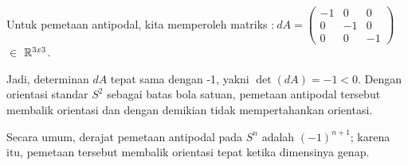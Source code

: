 Untuk pemetaan antipodal, kita memperoleh matriks
:$
\ dA = \begin{pmatrix}
-1 & 0 & 0 \\
0 & -1 & 0 \\
0 & 0 & -1 \end{pmatrix}
$ $ \in $ ${\mathbb R}^{3x3}$.

Jadi, determinan $dA$ tepat sama dengan -1, yakni
 $ \det(dA) = -1 <0$.
Dengan orientasi standar $S^2$ sebagai batas bola satuan, pemetaan antipodal tersebut membalik orientasi dan dengan demikian tidak mempertahankan orientasi.

Secara umum, derajat pemetaan antipodal pada $S^n$ adalah $(-1)^{n+1}$; karena itu, pemetaan tersebut membalik orientasi tepat ketika dimensinya genap.
